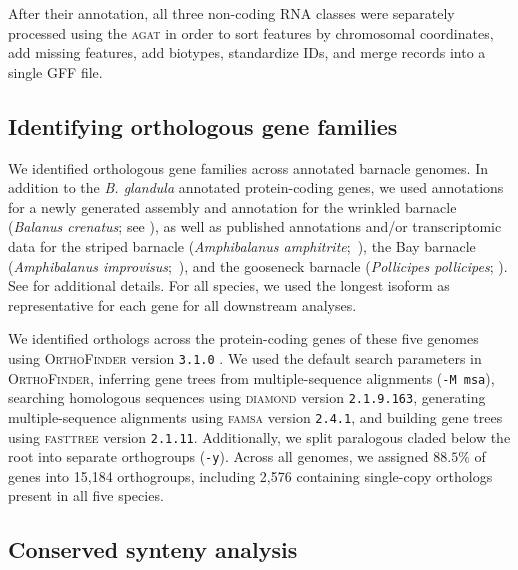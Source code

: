 \documentclass[11pt]{article}
\newcommand{\bgla}{\textit{B. glandula}\xspace}
\begin{document}
After their annotation, all three non-coding RNA classes were separately processed
using the \textsc{agat} in order to sort features by chromosomal coordinates, add
missing features, add biotypes, standardize IDs, and merge records into a single GFF file.

\subsection*{Identifying orthologous gene families}\label{sec:methods_orthologs}

We identified orthologous gene families across annotated barnacle genomes. In
addition to the \bgla{} annotated protein-coding genes, we used annotations for
a newly generated assembly and annotation for the wrinkled barnacle
(\textit{Balanus crenatus}; see ), as well as
published annotations and/or transcriptomic data for the striped barnacle
(\textit{Amphibalanus amphitrite};~\citealp{han_new_2024,kim_draft_2019}), the
Bay barnacle (\textit{Amphibalanus improvisus};~\citealp{bishop_genome_2025}),
and the gooseneck barnacle (\textit{Pollicipes pollicipes};
\citealp{bernot_chromosome-level_2022}).
See  for additional details.
For all species, we used the longest isoform as representative for each gene for
all downstream analyses.
\vspace{0.2cm}

We identified orthologs across the protein-coding genes of these five genomes using
\textsc{OrthoFinder} version \texttt{3.1.0} \citep{emms_orthofinder_2015,
emms_orthofinder_2019,emms_orthofinder_2025}. We used the default search parameters
in \textsc{OrthoFinder}, inferring gene trees from multiple-sequence alignments
(\texttt{-M msa}), searching homologous sequences using \textsc{diamond} version
\texttt{2.1.9.163}, generating multiple-sequence alignments using \textsc{famsa}
version \texttt{2.4.1}, and building gene trees using \textsc{fasttree} version
\texttt{2.1.11}. Additionally, we split paralogous claded below the root into
separate orthogroups (\texttt{-y}). Across all genomes, we assigned $88.5\%$ of
genes into 15,184 orthogroups, including 2,576 containing single-copy orthologs
present in all five species.

\subsection*{Conserved synteny analysis}
\end{document}
